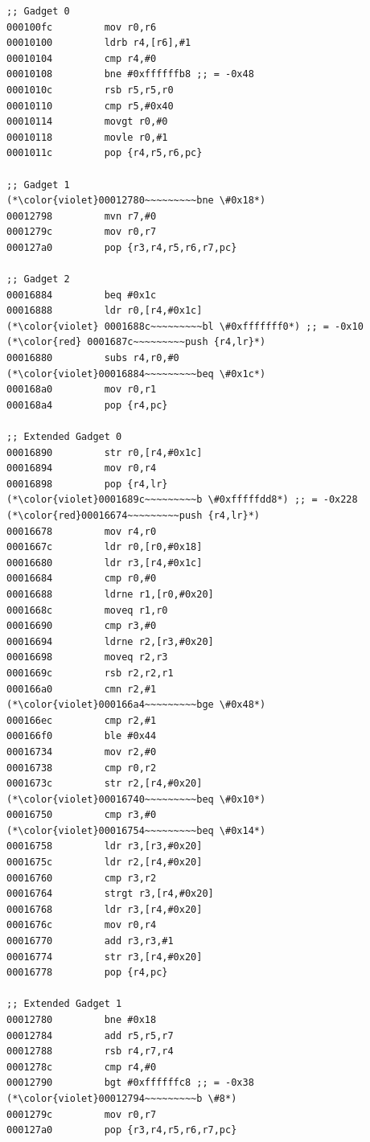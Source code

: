 \documentclass[12pt,glossary]{dalthesis}
\begin{document}
\begin{table}
\label{tab:labyrinthine}
\begin{multicols}{2}
\begin{lstlisting}[basicstyle=\scriptsize\ttfamily]
;; Gadget 0 
000100fc         mov r0,r6 
00010100         ldrb r4,[r6],#1 
00010104         cmp r4,#0
00010108         bne #0xffffffb8 ;; = -0x48
0001010c         rsb r5,r5,r0 
00010110         cmp r5,#0x40
00010114         movgt r0,#0 
00010118         movle r0,#1 
0001011c         pop {r4,r5,r6,pc}

;; Gadget 1 
(*\color{violet}00012780~~~~~~~~~bne \#0x18*)
00012798         mvn r7,#0 
0001279c         mov r0,r7
000127a0         pop {r3,r4,r5,r6,r7,pc}

;; Gadget 2 
00016884         beq #0x1c 
00016888         ldr r0,[r4,#0x1c] 
(*\color{violet} 0001688c~~~~~~~~~bl \#0xfffffff0*) ;; = -0x10 
(*\color{red} 0001687c~~~~~~~~~push {r4,lr}*)
00016880         subs r4,r0,#0 
(*\color{violet}00016884~~~~~~~~~beq \#0x1c*)
000168a0         mov r0,r1 
000168a4         pop {r4,pc}

;; Extended Gadget 0 
00016890         str r0,[r4,#0x1c] 
00016894         mov r0,r4
00016898         pop {r4,lr} 
(*\color{violet}0001689c~~~~~~~~~b \#0xfffffdd8*) ;; = -0x228
(*\color{red}00016674~~~~~~~~~push {r4,lr}*)
00016678         mov r4,r0 
0001667c         ldr r0,[r0,#0x18] 
00016680         ldr r3,[r4,#0x1c]
00016684         cmp r0,#0 
00016688         ldrne r1,[r0,#0x20] 
0001668c         moveq r1,r0
00016690         cmp r3,#0 
00016694         ldrne r2,[r3,#0x20] 
00016698         moveq r2,r3
0001669c         rsb r2,r2,r1 
000166a0         cmn r2,#1 
(*\color{violet}000166a4~~~~~~~~~bge \#0x48*)
000166ec         cmp r2,#1 
000166f0         ble #0x44 
00016734         mov r2,#0 
00016738         cmp r0,r2 
0001673c         str r2,[r4,#0x20] 
(*\color{violet}00016740~~~~~~~~~beq \#0x10*)
00016750         cmp r3,#0 
(*\color{violet}00016754~~~~~~~~~beq \#0x14*)
00016758         ldr r3,[r3,#0x20] 
0001675c         ldr r2,[r4,#0x20] 
00016760         cmp r3,r2
00016764         strgt r3,[r4,#0x20] 
00016768         ldr r3,[r4,#0x20] 
0001676c         mov r0,r4
00016770         add r3,r3,#1 
00016774         str r3,[r4,#0x20] 
00016778         pop {r4,pc} 

;; Extended Gadget 1 
00012780         bne #0x18 
00012784         add r5,r5,r7 
00012788         rsb r4,r7,r4 
0001278c         cmp r4,#0 
00012790         bgt #0xffffffc8 ;; = -0x38
(*\color{violet}00012794~~~~~~~~~b \#8*)
0001279c         mov r0,r7 
000127a0         pop {r3,r4,r5,r6,r7,pc}


\end{lstlisting}
\end{multicols}
\end{table}
\end{document}
